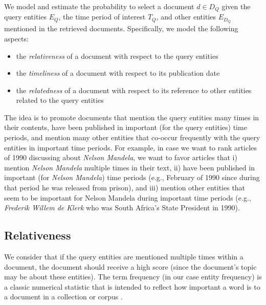 We model and estimate the probability to select a document $d \in D_Q$
given the query entities $E_Q$, the time period of interest $T_Q$,
and other entities $E_{D_Q}$ mentioned in the retrieved documents.
Specifically, we model the following aspects:
\begin{itemize}
\item the {\em relativeness} of a document with respect to the query entities
\item the {\em timeliness} of a document with respect to its publication date
\item the {\em relatedness} of a document with respect to its reference to other entities related to the query entities
\end{itemize}
The idea is to promote documents that
mention the query entities many times in their contents,
have been published in important (for the query entities) time periods, and
mention many other entities that co-occur frequently with the query entities in important time periods.
For example, in case we want to rank articles of 1990
discussing about {\em Nelson Mandela},
we want to favor articles that
i) mention {\em Nelson Mandela} multiple times in their text,
ii) have been published in important (for {\em Nelson Mandela}) time periods
(e.g., February of 1990 since during that period he was released from prison), and
iii) mention other entities that seem to be important for Nelson Mandela
during important time periods
(e.g., {\em Frederik Willem de Klerk} who was
South Africa's State President in 1990).

\subsection*{Relativeness}

We consider that if the query entities are mentioned multiple times
within a document, the document should receive a high score
(since the document's topic may be about these entities).
The term frequency (in our case entity frequency) is a classic numerical statistic
that is intended to reflect how important
a word is to a document in a collection or corpus \cite{leskovec2014mining}.

